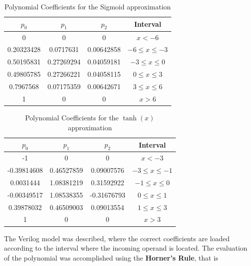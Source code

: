 \documentclass{IEEEtran}
\begin{document}
\begin{table}
	\caption{Polynomial Coefficients for the Sigmoid approximation}
	\label{tab:coefs-sigm}
    \centering
  \begin{tabular}{ | c | c | c | c | }
    \hline
    $p_0$      &  $p_1$     &  $p_2$        &  Interval  \\
		\hline
    0          & 0          &  0             & $x < -6$ \\
    \hline
    0.20323428 & 0.0717631  & 0.00642858     & $-6 \leq x \leq -3$ \\
    \hline
		0.50195831 & 0.27269294 & 0.04059181     & $-3 \leq  x \leq 0$ \\
		\hline
		0.49805785 & 0.27266221 & 0.04058115     &  $0 \leq  x \leq 3$ \\
		\hline
		0.7967568 & 0.07175359 & 0.00642671      & $3 \leq  x \leq 6$ \\
		\hline
		1         &  0         &   0             & $x > 6$ \\
		\hline
  \end{tabular}
\end{table}

\begin{table}
	\caption{Polynomial Coefficients for the $\tanh(x)$ approximation}
	\label{tab:coefs-tanh}
    \centering
  \begin{tabular}{ | c | c | c | c | }
    \hline
    $p_0$      &  $p_1$     &  $p_2$        &  Interval  \\
		\hline
    -1          & 0          &  0             & $x < -3$ \\
    \hline
    -0.39814608 & 0.46527859 &  0.09007576   & $-3 \leq x \leq -1$ \\
    \hline
		0.0031444 & 1.08381219 & 0.31592922      & $-1 \leq  x \leq 0$ \\
		\hline
		-0.00349517 & 1.08538355 & -0.31676793   &  $0 \leq  x \leq 1$ \\
		\hline
		0.39878032 & 0.46509003 & 0.09013554     & $1 \leq  x \leq 3$ \\
		\hline
		1         &  0         &   0             & $x > 3$ \\
		\hline
  \end{tabular}
\end{table}
The Verilog model was described, where the correct
coefficients are loaded according to the interval where the incoming operand is located. The evaluation of the polynomial
was accomplished using the \textbf{Horner's Rule}, that is
\end{document}
